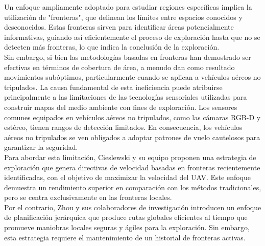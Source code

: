 \documentclass[sigconf]{acmart}
\begin{document}
Un enfoque ampliamente adoptado para estudiar regiones específicas implica la utilización de "fronteras", que delinean los límites entre espacios conocidos y desconocidos. Estas fronteras sirven para identificar áreas potencialmente informativas, guiando así eficientemente el proceso de exploración hasta que no se detecten más fronteras, lo que indica la conclusión de la exploración.\\

Sin embargo, si bien las metodologías basadas en fronteras han demostrado ser efectivas en términos de cobertura de área, a menudo dan como resultado movimientos subóptimos, particularmente cuando se aplican a vehículos aéreos no tripulados. La causa fundamental de esta ineficiencia puede atribuirse principalmente a las limitaciones de las tecnologías sensoriales utilizadas para construir mapas del medio ambiente con fines de exploración. Los sensores comunes equipados en vehículos aéreos no tripulados, como las cámaras RGB-D y estéreo, tienen rangos de detección limitados. En consecuencia, los vehículos aéreos no tripulados se ven obligados a adoptar patrones de vuelo cautelosos para garantizar la seguridad.\\

Para abordar esta limitación, Cieslewski y su equipo proponen una estrategia de exploración que genera directivas de velocidad basadas en fronteras recientemente identificadas, con el objetivo de maximizar la velocidad del UAV. Este enfoque demuestra un rendimiento superior en comparación con los métodos tradicionales, pero se centra exclusivamente en las fronteras locales.\\

Por el contrario, Zhou y sus colaboradores de investigación introducen un enfoque de planificación jerárquica que produce rutas globales eficientes al tiempo que promueve maniobras locales seguras y ágiles para la exploración. Sin embargo, esta estrategia requiere el mantenimiento de un historial de fronteras activas.\\ %
\end{document}
